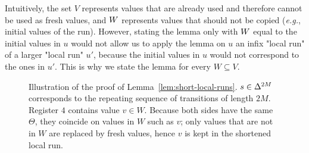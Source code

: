 Intuitively, the set $V$ represents values that are already used and therefore cannot be used as fresh values, and $W$ represents values that should not be copied (\emph{e.g.}, initial values of the run). However, stating the lemma only with $W$ equal to the initial values in $u$ would not allow us to apply the lemma on $u$ an infix "local run" of a larger "local run" $u'$, because the initial values in $u$ would not correspond to the ones in $u'$. This is why we state the lemma for every $W \subseteq V$.  

\begin{figure}[h]
	
	\caption{Illustration of the proof of Lemma~\ref{lem:short-local-runs}. $s \in \Delta^{2M}$ corresponds to the repeating sequence of transitions of length $2M$. Register $4$ contains value $v \in W$. Because both sides have the same $\Theta$, they coincide on values in $W$ such as $v$; only values that are not in $W$ are replaced by fresh values, hence $v$ is kept in the shortened local run.}
	\label{fig:pumping}
\end{figure}

